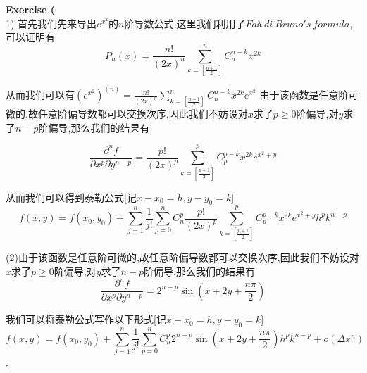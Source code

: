 \documentclass{article}
\newenvironment{exercise}[1]{%
{\textbf{Exercise #1} \\ 
    }
}{
  \hfill $\square$ 
  \par\bigskip 
}
\newcommand{\parameter}[1]{\left(#1\right)}
\newcommand{\bracket}[1]{\left[#1\right]}
\begin{document}
\begin{CJK}{UTF8}{gkai}
\begin{exercise}{17}
    (1)
    首先我们先来导出$e^{x^2}$的$n$阶导数公式,这里我们利用了$Faà~di~Bruno's~formula$,可以证明有
    \[P_n(x) = \frac{n!}{(2x)^n} \sum_{k = \bracket{\frac{n+1}{2}}}^{n}C_{n}^{n - k} x^{2k}\]

    从而我们可以有$(e^{x^2})^{(n)} = \frac{n!}{(2x)^n} \sum_{k = \bracket{\frac{n+1}{2}}}^{n}C_{n}^{n - k} x^{2k} e^{x^2}$
    由于该函数是任意阶可微的,故任意阶偏导数都可以交换次序,因此我们不妨设对$x$求了$p \geq 0$阶偏导,对$y$求了$n - p$阶偏导,那么我们的结果有
    
    \[\frac{\partial^n f}{\partial x^p \partial y^{n - p}} = \frac{p!}{(2x)^p} \sum_{k = \bracket{\frac{p+1}{2}}}^{p}C_{p}^{p - k} x^{2k} e^{x^2 + y}\]

    从而我们可以得到泰勒公式[记$x - x_0 = h,y - y_0 = k$]
    \[f(x,y) = f(x_0,y_0) + \sum_{j = 1}^{n} \frac{1}{j !}\sum_{p = 0}^{n} C_{n}^{p} \frac{p!}{(2x)^p} \sum_{k = \bracket{\frac{p+1}{2}}}^{p}C_{p}^{p - k} x^{2k} e^{x^2 + y} h^p k^{n - p}\]

    (2)由于该函数是任意阶可微的,故任意阶偏导数都可以交换次序,因此我们不妨设对$x$求了$p \geq 0$阶偏导,对$y$求了$n - p$阶偏导,那么我们的结果有
    \[\frac{\partial^n f}{\partial x^p \partial y^{n - p}} = 2^{n - p} \sin(x + 2y + \frac{n\pi}{2})\]

    我们可以将泰勒公式写作以下形式[记$x - x_0 = h,y - y_0 = k$]
    \[f(x,y) = f(x_0,y_0) + \sum_{j = 1}^{n}\frac{1}{j !} \sum_{p = 0}^n C_{n}^p 2^{n - p} \sin(x + 2y +  \frac{n\pi}{2})h^p k^{n - p} + o(\Delta x^n)\]





\end{exercise}
\end{CJK}
\end{document}
